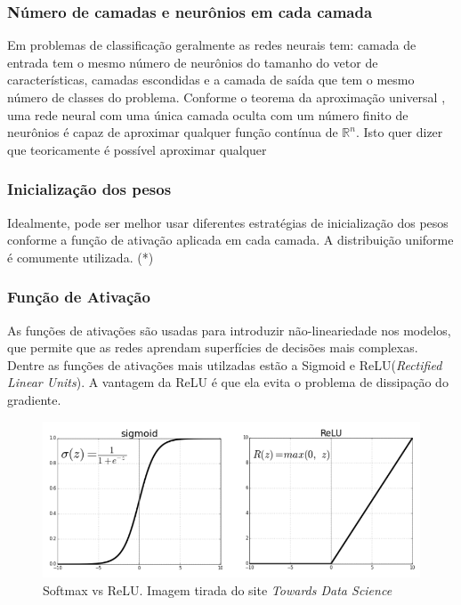 \subsubsection{Número de camadas e neurônios em cada camada}
Em problemas de classificação geralmente as redes neurais tem: camada de entrada tem o mesmo número de neurônios do tamanho do vetor de características, camadas escondidas e a camada de saída que tem o mesmo número de classes do problema. Conforme o teorema da aproximação universal \cite{universal1989}, uma rede neural com uma única camada oculta com um número finito de neurônios é capaz de aproximar qualquer função contínua de $\mathbb{R}^n$. Isto quer dizer que teoricamente é possível aproximar qualquer 
\subsubsection{Inicialização dos pesos}
Idealmente, pode ser melhor usar diferentes estratégias de inicialização dos pesos conforme a função de ativação aplicada em cada camada. A distribuição uniforme é comumente utilizada. (*)

\subsubsection{Função de Ativação}
As funções de ativações são usadas para introduzir não-lineariedade nos modelos, que permite que as redes aprendam superfícies de decisões mais complexas. Dentre as funções de ativações mais utilzadas estão a Sigmoid e ReLU(\textit{Rectified Linear Units}). A vantagem  da ReLU é que ela evita o problema de dissipação do gradiente.


\begin{figure}[H]
	\centering
	\includegraphics[scale=0.4]{pasta1_figuras/activation_function.png}
	\caption{Softmax vs ReLU. Imagem tirada do site \textit{Towards Data Science} \cite{towardsdatascience}}
	\label{fig-activations}
\end{figure}


